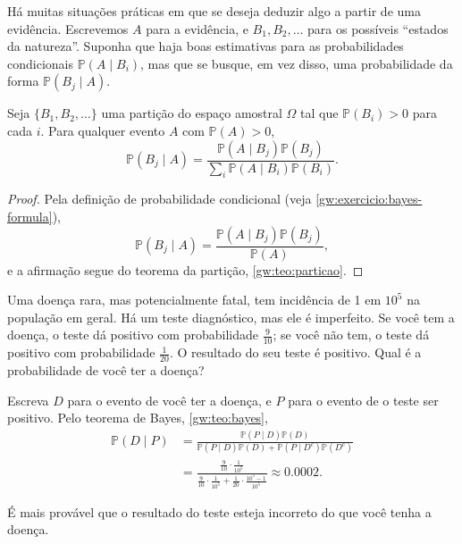 Há muitas situações práticas em que se deseja deduzir algo a partir de uma
evidência. Escrevemos \(A\) para a evidência, e \(B_1, B_2, \ldots\) para os
possíveis ``estados da natureza''. Suponha que haja boas estimativas para as
probabilidades condicionais \(\mathbb{P}(A \mid B_i)\), mas que se busque, em
vez disso, uma probabilidade da forma \(\mathbb{P}(B_j \mid A)\).

\begin{theorem}\label{gw:teo:bayes}
  Seja \(\{B_1, B_2, \ldots\}\) uma partição do espaço amostral \(\Omega\) tal
  que \(\mathbb{P}(B_i) > 0\) para cada \(i\). Para qualquer evento \(A\) com
  \(\mathbb{P}(A) > 0\),
  \[
    \mathbb{P}(B_j \mid A) = \frac{\mathbb{P}(A \mid
    B_j)\mathbb{P}(B_j)}{\sum_i \mathbb{P}(A \mid B_i)\mathbb{P}(B_i)}.
  \]
\end{theorem}

\begin{proof}
  Pela definição de probabilidade condicional (veja
  \cref{gw:exercicio:bayes-formula}),
  \[
    \mathbb{P}(B_j \mid A) = \frac{\mathbb{P}(A \mid
    B_j)\mathbb{P}(B_j)}{\mathbb{P}(A)},
  \]
  e a afirmação segue do teorema da partição, \cref{gw:teo:particao}.
\end{proof}

\begin{example}\label{gw:exemplo:falsos-positivos}
  Uma doença rara, mas potencialmente fatal, tem incidência de 1 em \(10^5\) na
  população em geral. Há um teste diagnóstico, mas ele é imperfeito. Se você
  tem a doença, o teste dá positivo com probabilidade \(\tfrac{9}{10}\); se
  você não tem, o teste dá positivo com probabilidade \(\tfrac{1}{20}\). O
  resultado do seu teste é positivo. Qual é a probabilidade de você ter a
  doença?
  \begin{solution}
    Escreva \(D\) para o evento de você ter a doença, e \(P\) para o evento de
    o teste ser positivo. Pelo teorema de Bayes, \cref{gw:teo:bayes},
    \[
      \begin{aligned}
        \mathbb{P}(D \mid P) &= \frac{\mathbb{P}(P \mid
          D)\mathbb{P}(D)}{\mathbb{P}(P \mid D)\mathbb{P}(D) + \mathbb{P}(P
          \mid D^c)\mathbb{P}(D^c)} \\
        &= \frac{\frac{9}{10} \cdot \frac{1}{10^5}}{\frac{9}{10} \cdot
          \frac{1}{10^5} + \frac{1}{20} \cdot \frac{10^5 - 1}{10^5}}
          \approx 0.0002.
      \end{aligned}
    \]
  \end{solution}
  É mais provável que o resultado do teste esteja incorreto do que você tenha
  a doença.
\end{example}

